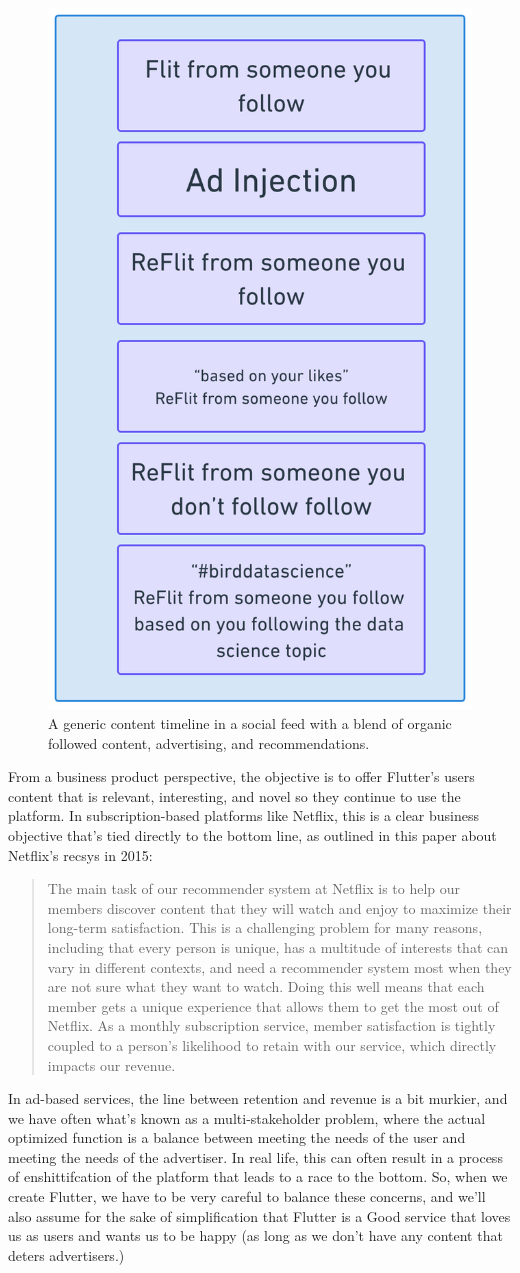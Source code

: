 \documentclass[11pt]{diazessay} %
\begin{document}
\begin{figure}[!ht]
\centering
\includegraphics[width=.4\textwidth]{figures/timeline.png}
\caption{A generic content timeline in a social feed with a blend of organic followed content, advertising, and recommendations.}
\end{figure}

From a business product perspective, the objective is to offer Flutter’s users content that is relevant, interesting, and novel so they continue to use the platform. In subscription-based platforms like Netflix, this is a clear business objective that's tied directly to the bottom line, as outlined in this paper \citep{steck2021deep}  about Netflix's recsys in 2015: 

\begin{quote}

The main task of our recommender system at Netflix is to help our members discover content that they will watch and enjoy to maximize their long-term satisfaction. This is a challenging problem for many reasons, including that every person is unique, has a multitude of interests that can vary in different contexts, and need a recommender system most when they are not sure what they want to watch. Doing this well means that each member gets a unique experience that allows them to get the most out of Netflix. As a monthly subscription service, member satisfaction is tightly coupled to a person’s likelihood to retain with our service, which directly impacts our revenue.
\end{quote}

In ad-based services, the line between retention and revenue is a bit murkier, and we have often what's known as a multi-stakeholder problem, where the actual optimized function is a balance between meeting the needs of the user and meeting the needs of the advertiser\citep{zheng2017multi}.  In real life, this can often result in a process of enshittifcation\citep{doctorow_2023} of the platform that leads to a race to the bottom. So, when we create Flutter, we have to be very careful to balance these concerns, and we'll also assume for the sake of simplification that Flutter is a Good service that loves us as users and wants us to be happy (as long as we don't have any content that deters advertisers.)
\end{document}

